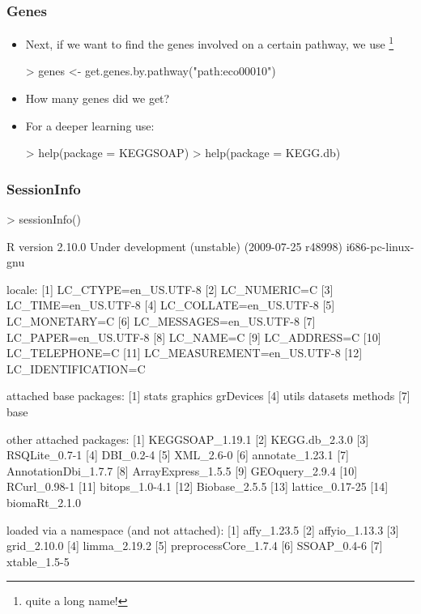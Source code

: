 \begin{frame}
  \frametitle{Genes}
  \begin{itemize}
  \item Next, if we want to find the genes involved on a certain pathway, we use \footnote{quite a long name!}
\begin{Schunk}
\begin{Sinput}
> genes <- get.genes.by.pathway("path:eco00010")
\end{Sinput}
\end{Schunk}
  \item How many genes did we get?
  \item For a deeper learning use:
\begin{Schunk}
\begin{Sinput}
> help(package = KEGGSOAP)
> help(package = KEGG.db)
\end{Sinput}
\end{Schunk}
  \end{itemize}
\end{frame}

\begin{frame}
  \frametitle{SessionInfo} \scriptsize
\begin{Schunk}
\begin{Sinput}
> sessionInfo()
\end{Sinput}
\begin{Soutput}
R version 2.10.0 Under development (unstable) (2009-07-25 r48998) 
i686-pc-linux-gnu 

locale:
 [1] LC_CTYPE=en_US.UTF-8      
 [2] LC_NUMERIC=C              
 [3] LC_TIME=en_US.UTF-8       
 [4] LC_COLLATE=en_US.UTF-8    
 [5] LC_MONETARY=C             
 [6] LC_MESSAGES=en_US.UTF-8   
 [7] LC_PAPER=en_US.UTF-8      
 [8] LC_NAME=C                 
 [9] LC_ADDRESS=C              
[10] LC_TELEPHONE=C            
[11] LC_MEASUREMENT=en_US.UTF-8
[12] LC_IDENTIFICATION=C       

attached base packages:
[1] stats     graphics  grDevices
[4] utils     datasets  methods  
[7] base     

other attached packages:
 [1] KEGGSOAP_1.19.1    
 [2] KEGG.db_2.3.0      
 [3] RSQLite_0.7-1      
 [4] DBI_0.2-4          
 [5] XML_2.6-0          
 [6] annotate_1.23.1    
 [7] AnnotationDbi_1.7.7
 [8] ArrayExpress_1.5.5 
 [9] GEOquery_2.9.4     
[10] RCurl_0.98-1       
[11] bitops_1.0-4.1     
[12] Biobase_2.5.5      
[13] lattice_0.17-25    
[14] biomaRt_2.1.0      

loaded via a namespace (and not attached):
[1] affy_1.23.5         
[2] affyio_1.13.3       
[3] grid_2.10.0         
[4] limma_2.19.2        
[5] preprocessCore_1.7.4
[6] SSOAP_0.4-6         
[7] xtable_1.5-5        
\end{Soutput}
\end{Schunk}
\end{frame}




